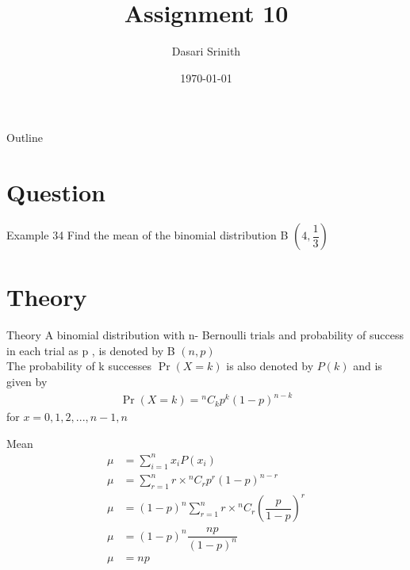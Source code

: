 \documentclass{beamer}
\title{Assignment 10}
\author{Dasari Srinith}
\date{\today}
\providecommand{\pr}[1]{\ensuremath{\Pr\left(#1\right)}}
\newcommand*{\Comb}[2]{{}^{#1}C_{#2}}
\providecommand{\brak}[1]{\ensuremath{\left(#1\right)}}
\begin{document}
    \begin{frame}
        \titlepage 
    \end{frame}

    \begin{frame}{Outline}
        \tableofcontents
    \end{frame}

    \section{Question}
    	\begin{frame}{Example 34}
    	Find the mean of the binomial distribution B \brak{4,\dfrac{1}{3}}
    	\end{frame}

    \section{Theory}
        \begin{frame}{Theory}
        A binomial distribution with n- Bernoulli trials and probability of success in each trial as p , is denoted by B \brak{n,p}
        \\\vspace{0.5cm}
        The probability of k successes $\pr{X = k}$ is also denoted by $P(k)$ and is given by 
            \begin{align}
                \pr{X = k} = \Comb{n}{k} p^k\brak{1-p}^{n-k}
                \label{eq:1}
            \end{align}
            for $x = 0,1,2,...,n-1,n$ 
        \end{frame}
        
        \begin{frame}{Mean}
        \begin{align}
            \mu &= \sum^{n}_{i=1} x_i P(x_i) \\
            \mu &= \sum^{n}_{r=1} r \times \Comb{n}{r} p^r\brak{1-p}^{n-r} \\
            \mu &= (1-p)^{n} \sum^{n}_{r=1} r \times                 \Comb{n}{r}\brak{\dfrac{p}{1-p}}^r \\
            \mu &= (1-p)^{n} \dfrac{np}{(1-p)^{n}} \\
            \mu &= np
            \label{eq:6}
        \end{align}
            
        \end{frame}
    
\end{document}
